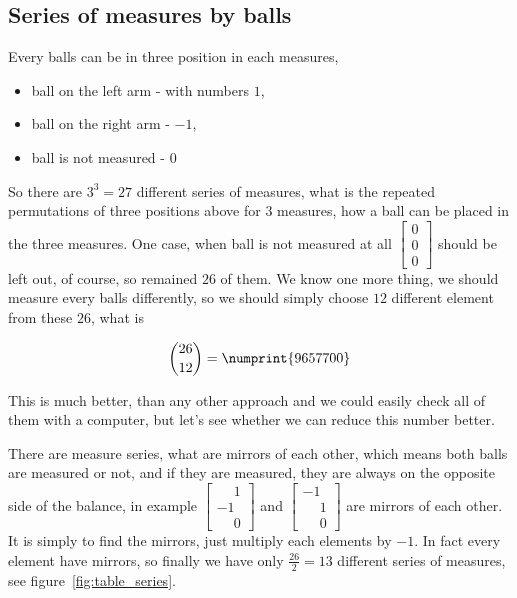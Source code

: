 \documentclass[11pt]{article} %
\begin{document}
\subsection{Series of measures by balls}

Every balls can be in three position in each measures,
\begin{itemize}
\item ball on the left arm - with numbers $1$,
\item ball on the right arm - $-1$,
\item ball is not measured - $0$
\end{itemize}
So there are $3^3 = 27$ different series of measures, what is the repeated permutations of three positions above for $3$ measures, how a ball can be placed in the three measures. One case, when ball is not measured at all $\left[\begin{smallmatrix}0\\0\\0\end{smallmatrix}\right]$ should be left out, of course, so remained $26$ of them. We know one more thing, we should measure every balls differently, so we should simply choose $12$ different element from these $26$, what is

\[ \binom{26}{12} = \numprint{9657700} \]

This is much better, than any other approach and we could easily check all of them with a computer, but let's see whether we can reduce this number better.

There are measure series, what are mirrors of each other, which means both balls are measured or not, and if they are measured, they are always on the opposite side of the balance, in example $\left[\begin{smallmatrix}\phantom{{}-{}}1\\-1\\\phantom{{}-{}}0\end{smallmatrix}\right]$ and $\left[\begin{smallmatrix}-1\\\phantom{{}-{}}1\\\phantom{{}-{}}0\end{smallmatrix}\right]$ are mirrors of each other. It is simply to find the mirrors, just multiply each elements by $-1$. In fact every element have mirrors, so finally we have only $\frac{26}{2} = 13$ different series of measures, see figure~\ref{fig:table_series}.
\end{document}
